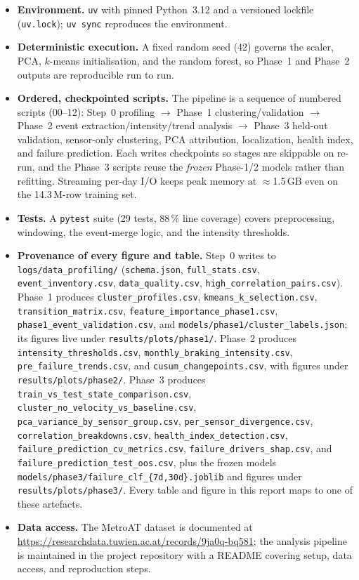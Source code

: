 \documentclass[11pt,a4paper]{article}
\begin{document}
\begin{itemize}[leftmargin=1.4em,itemsep=0.2em]
\item \textbf{Environment.} \texttt{uv} with pinned Python~3.12 and a versioned lockfile
(\texttt{uv.lock}); \texttt{uv sync} reproduces the environment.
\item \textbf{Deterministic execution.} A fixed random seed (42) governs the scaler, PCA,
$k$-means initialisation, and the random forest, so Phase~1 and Phase~2 outputs are
reproducible run to run.
\item \textbf{Ordered, checkpointed scripts.} The pipeline is a sequence of numbered
scripts (00--12): Step~0 profiling $\rightarrow$ Phase~1 clustering/validation
$\rightarrow$ Phase~2 event extraction/intensity/trend analysis $\rightarrow$ Phase~3
held-out validation, sensor-only clustering, PCA attribution, localization, health index,
and failure prediction. Each writes checkpoints so stages are skippable on re-run, and the
Phase~3 scripts reuse the \emph{frozen} Phase-1/2 models rather than refitting. Streaming
per-day I/O keeps peak memory at $\approx$1.5\,GB even on the 14.3\,M-row training set.
\item \textbf{Tests.} A \texttt{pytest} suite (29 tests, 88\,\% line coverage) covers
preprocessing, windowing, the event-merge logic, and the intensity thresholds.
\item \textbf{Provenance of every figure and table.} Step~0 writes to
\texttt{logs/data\_profiling/} (\texttt{schema.json}, \texttt{full\_stats.csv},
\texttt{event\_inventory.csv}, \texttt{data\_quality.csv},
\texttt{high\_correlation\_pairs.csv}). Phase~1 produces
\texttt{cluster\_profiles.csv}, \texttt{kmeans\_k\_selection.csv},
\texttt{transition\_matrix.csv}, \texttt{feature\_importance\_phase1.csv},
\texttt{phase1\_event\_validation.csv}, and \texttt{models/phase1/cluster\_labels.json};
its figures live under \texttt{results/plots/phase1/}. Phase~2 produces
\texttt{intensity\_thresholds.csv}, \texttt{monthly\_braking\_intensity.csv},
\texttt{pre\_failure\_trends.csv}, and \texttt{cusum\_changepoints.csv}, with figures
under \texttt{results/plots/phase2/}. Phase~3 produces
\texttt{train\_vs\_test\_state\_comparison.csv}, \texttt{cluster\_no\_velocity\_vs\_baseline.csv},
\texttt{pca\_variance\_by\_sensor\_group.csv}, \texttt{per\_sensor\_divergence.csv},
\texttt{correlation\_breakdowns.csv}, \texttt{health\_index\_detection.csv},
\texttt{failure\_prediction\_cv\_metrics.csv}, \texttt{failure\_drivers\_shap.csv}, and
\texttt{failure\_prediction\_test\_oos.csv}, plus the frozen models
\texttt{models/phase3/failure\_clf\_\{7d,30d\}.joblib} and figures under
\texttt{results/plots/phase3/}. Every table and figure in this report maps to one of these
artefacts.
\item \textbf{Data access.} The MetroAT dataset is documented at
\url{https://researchdata.tuwien.ac.at/records/9ja0q-bq581}; the analysis pipeline is
maintained in the project repository with a README covering setup, data access, and
reproduction steps.
\end{itemize}
\end{document}
